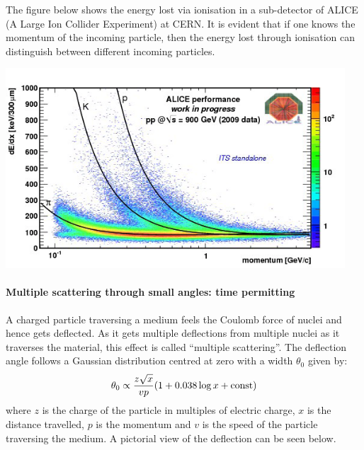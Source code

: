 The figure below shows the energy lost via ionisation in a sub-detector of ALICE (A Large Ion Collider Experiment) at CERN. It is evident that if one knows the momentum of the incoming particle, then the energy lost through ionisation can distinguish between different incoming particles.
\begin{center}
\includegraphics[width=0.95\textwidth]{fig/strongforce/matterinteractions/alice_dedx.png}
\end{center}

\paragraph{Multiple scattering through small angles: time permitting}
A charged particle traversing a medium feels the Coulomb force of nuclei and hence gets deflected. As it gets multiple deflections from multiple nuclei as it traverses the material, this effect is called ``multiple scattering''. The deflection angle follows a Gaussian distribution centred at zero with a width $\theta_0$ given by:
\[
\theta_0\propto \frac{z\sqrt{x}}{vp}(1+0.038\log{x}+{\rm const})
\]
where $z$ is the charge of the particle in multiples of electric charge, $x$ is the distance travelled, $p$ is the momentum and $v$ is the speed of the particle traversing the medium. A pictorial view of the deflection can be seen below.

